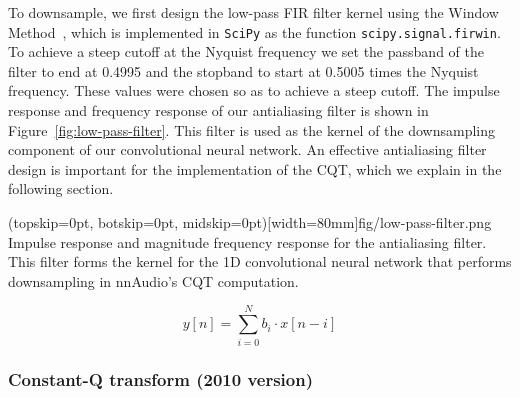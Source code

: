 \documentclass{ieeeaccess}
\newcommand{\nbh}[1]{\texttt{#1}}
\begin{document}
To downsample, we first design the low-pass FIR filter kernel using the Window Method~\cite{rajput2012implementation}, which is implemented in \nbh{SciPy} as the function \nbh{scipy.signal.firwin}. To achieve a steep cutoff at the Nyquist frequency we set the passband of the filter to end at 0.4995 and the stopband to start at 0.5005 times the Nyquist frequency. These values were chosen so as to achieve a steep cutoff. The impulse response and frequency response of our antialiasing filter is shown in Figure~\ref{fig:low-pass-filter}. This filter is used as the kernel of the downsampling component of our convolutional neural network. An effective antialiasing filter design is important for the implementation of the CQT, which we explain in the following section.

\Figure(topskip=0pt, botskip=0pt, midskip=0pt)[width=80mm]{fig/low-pass-filter.png}
{Impulse response and magnitude frequency response for the antialiasing filter. This filter forms the kernel for the 1D convolutional neural network that performs downsampling in nnAudio's CQT computation. \label{fig:low-pass-filter}}

\begin{equation}
    y[n] = \sum_{i=0}^{N}b_i\cdot x[n-i]
    \label{FIR}
\end{equation}


\subsubsection{Constant-Q transform (2010 version)}
\end{document}
